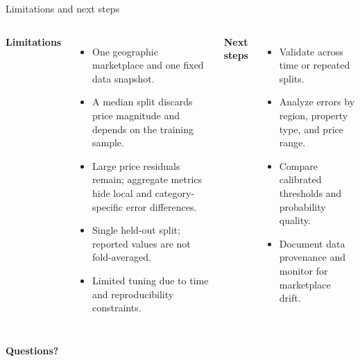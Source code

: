 \documentclass[aspectratio=169,10pt]{beamer}
\begin{document}
\begin{frame}{Limitations and next steps}
  \begin{columns}[T,onlytextwidth]
      \textbf{Limitations}
      \begin{itemize}
        \item One geographic marketplace and one fixed data snapshot.
        \item A median split discards price magnitude and depends on the
          training sample.
        \item Large price residuals remain; aggregate metrics hide local and
          category-specific error differences.
        \item Single held-out split; reported values are not fold-averaged.
        \item Limited tuning due to time and reproducibility constraints.
      \end{itemize}
      \textbf{Next steps}
      \begin{itemize}
        \item Validate across time or repeated splits.
        \item Analyze errors by region, property type, and price range.
        \item Compare calibrated thresholds and probability quality.
        \item Document data provenance and monitor for marketplace drift.
      \end{itemize}
  \end{columns}
  \vfill
  \centering\large\color{teal}\bfseries Questions?
\end{frame}
\end{document}
